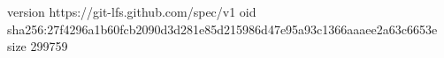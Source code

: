 version https://git-lfs.github.com/spec/v1
oid sha256:27f4296a1b60fcb2090d3d281e85d215986d47e95a93c1366aaaee2a63c6653e
size 299759

